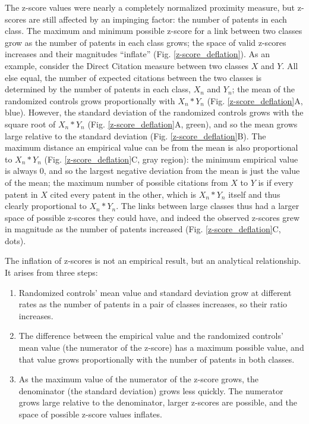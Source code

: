 \documentclass[]{svjour3}
\begin{document}
The z-score values were nearly a completely normalized proximity measure, but z-scores are still affected by an impinging factor: the number of patents in each class. The maximum and minimum possible z-score for a link between two classes grow as the number of patents in each class grows; the space of valid z-scores increases and their magnitudes ``inflate'' (Fig. \ref{z-score_deflation}). As an example, consider the Direct Citation measure between two classes $X$ and $Y$. All else equal, the number of expected citations between the two classes is determined by the number of patents in each class, $X_n$ and $Y_n$; the mean of the randomized controls grows proportionally with $X_n*Y_n$ (Fig. \ref{z-score_deflation}A, blue). However, the standard deviation of the randomized controls grows with the square root of $X_n*Y_n$ (Fig. \ref{z-score_deflation}A, green), and so the mean grows large relative to the standard deviation (Fig. \ref{z-score_deflation}B). The maximum distance an empirical value can be from the mean is also proportional to $X_n*Y_n$ (Fig. \ref{z-score_deflation}C, gray region): the minimum empirical value is always 0, and so the largest negative deviation from the mean is just the value of the mean; the maximum number of possible citations from $X$ to $Y$ is if every patent in $X$ cited every patent in the other, which is $X_n*Y_n$ itself and thus clearly proportional to $X_n*Y_n$. The links between large classes thus had a larger space of possible z-scores they could have, and indeed the observed z-scores grew in magnitude as the number of patents increased (Fig. \ref{z-score_deflation}C, dots).

The inflation of z-scores is not an empirical result, but an analytical relationship. It arises from three steps:
\begin{enumerate}
\item Randomized controls' mean value and standard deviation grow at different rates as the number of patents in a pair of classes increases, so their ratio increases.
\item The difference between the empirical value and the randomized controls' mean value (the numerator of the z-score) has a maximum possible value, and that value grows proportionally with the number of patents in both classes. 
\item As the maximum value of the numerator of the z-score grows, the denominator (the standard deviation) grows less quickly. The numerator grows large relative to the denominator, larger z-scores are possible, and the space of possible z-score values inflates.
\end{enumerate}
\end{document}
